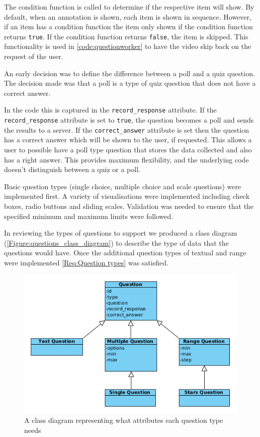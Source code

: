 The condition function is called to determine if the respective item will show. By default, when an \gls{annotation} is shown, each item is shown in sequence. However, if an item has a condition function the item only shown if the condition function returns \lstinline|true|. If the condition function returns \lstinline|false|, the item is skipped. This functionality is used in \autoref{code:questionworker} to have the video skip back on the request of the user.

An early decision was to define the difference between a poll and a quiz question. The decision made was that a poll is a type of quiz question that does not have a correct answer.

In the code this is captured in the \lstinline|record_response| attribute. If the \lstinline|record_response| attribute is set to \lstinline|true|, the question becomes a poll and sends the results to a server. If the \lstinline|correct_answer| attribute is set then the question has a correct answer which will be shown to the user, if requested. This allows a user to possible have a poll type question that stores the data collected and also has a right answer. This provides maximum flexibility, and the underlying code doesn't distinguish between a quiz or a poll.

Basic question types (single choice, multiple choice and scale questions) were implemented first. A variety of visualisations were implemented including check boxes, radio buttons and sliding scales. Validation was needed to ensure that the specified minimum and maximum limits were followed.

In reviewing the types of questions to support we produced a class diagram (\autoref{Figure:questions_class_diagram}) to describe the type of data that the questions would have. Once the additional question types of textual and range were implemented \cref{Req:Question types} was satisfied.

\begin{figure}
	\centering
	\includegraphics[width=12cm]{../figures/questions_class_diagram.png}
	\caption{A class diagram representing what attributes each question type needs}
	\label{Figure:questions_class_diagram}
\end{figure}

